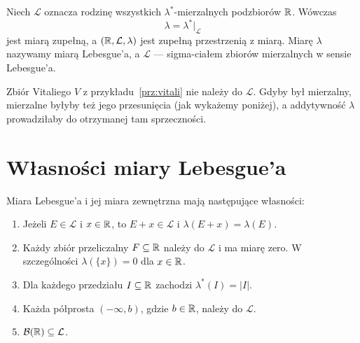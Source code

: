 \begin{wniosek}
\label{wn:miara-lebesgue}
Niech $\mathcal{L}$ oznacza rodzinę wszystkich
$\lambda^{\ast}$-mierzalnych podzbiorów $\mathbb{R}$. Wówczas
\[
  \lambda=\lambda^{\ast}|_{\mathcal{L}}
\]
jest miarą zupełną, a $(\mathbb{R},\mathcal{L},\lambda)$ jest zupełną
przestrzenią z miarą. Miarę $\lambda$ nazywamy miarą Lebesgue'a,
a $\mathcal{L}$ --- sigma-ciałem zbiorów mierzalnych w sensie Lebesgue'a.
\end{wniosek}

\begin{uwaga}
Zbiór Vitaliego $V$ z przykładu~\ref{prz:vitali} nie należy do
$\mathcal{L}$. Gdyby był mierzalny, mierzalne byłyby też jego
przesunięcia (jak wykażemy poniżej), a addytywność $\lambda$
prowadziłaby do otrzymanej tam sprzeczności.
\end{uwaga}

\section{Własności miary Lebesgue'a}
\label{sec:wlasnosci-lebesgue}

\begin{samepage}
\begin{fakt}
\label{fakt:wlasnosci-lebesgue}
Miara Lebesgue'a i jej miara zewnętrzna mają następujące własności:
\begin{enumerate}
  \item Jeżeli $E\in\mathcal{L}$ i $x\in\mathbb{R}$, to $E+x\in\mathcal{L}$
    i $\lambda(E+x)=\lambda(E)$.
  \item Każdy zbiór przeliczalny $F\subseteq\mathbb{R}$ należy do
    $\mathcal{L}$ i ma miarę zero. W szczególności
    $\lambda(\{x\})=0$ dla $x\in\mathbb{R}$.
  \item Dla każdego przedziału $I\subseteq\mathbb{R}$ zachodzi
    $\lambda^{\ast}(I)=|I|$.
  \item Każda półprosta $(-\infty,b)$, gdzie $b\in\mathbb{R}$,
    należy do $\mathcal{L}$.
  \item $\mathcal{B}(\mathbb{R})\subseteq\mathcal{L}$.
\end{enumerate}
\end{fakt}
\end{samepage}

